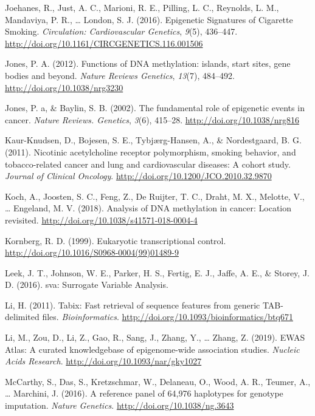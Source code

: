 \documentclass[11pt,twoside]{bristolthesis}
\newlength{\cslhangindent}
\newenvironment{cslreferences}%
  {\setlength{\parindent}{0pt}%
  \everypar{\setlength{\hangindent}{\cslhangindent}}\ignorespaces}%
  {\par}
\begin{document}
\begin{cslreferences}
\leavevmode\hypertarget{ref-Joehanes2016}{}%
Joehanes, R., Just, A. C., Marioni, R. E., Pilling, L. C., Reynolds, L. M., Mandaviya, P. R., \ldots{} London, S. J. (2016). Epigenetic Signatures of Cigarette Smoking. \emph{Circulation: Cardiovascular Genetics}, \emph{9}(5), 436--447. \url{http://doi.org/10.1161/CIRCGENETICS.116.001506}

\leavevmode\hypertarget{ref-Jones2012}{}%
Jones, P. A. (2012). Functions of DNA methylation: islands, start sites, gene bodies and beyond. \emph{Nature Reviews Genetics}, \emph{13}(7), 484--492. \url{http://doi.org/10.1038/nrg3230}

\leavevmode\hypertarget{ref-Jones2002}{}%
Jones, P. a, \& Baylin, S. B. (2002). The fundamental role of epigenetic events in cancer. \emph{Nature Reviews. Genetics}, \emph{3}(6), 415--28. \url{http://doi.org/10.1038/nrg816}

\leavevmode\hypertarget{ref-Kaur-Knudsen2011}{}%
Kaur-Knudsen, D., Bojesen, S. E., Tybjærg-Hansen, A., \& Nordestgaard, B. G. (2011). Nicotinic acetylcholine receptor polymorphism, smoking behavior, and tobacco-related cancer and lung and cardiovascular diseases: A cohort study. \emph{Journal of Clinical Oncology}. \url{http://doi.org/10.1200/JCO.2010.32.9870}

\leavevmode\hypertarget{ref-Koch2018}{}%
Koch, A., Joosten, S. C., Feng, Z., De Ruijter, T. C., Draht, M. X., Melotte, V., \ldots{} Engeland, M. V. (2018). Analysis of DNA methylation in cancer: Location revisited. \url{http://doi.org/10.1038/s41571-018-0004-4}

\leavevmode\hypertarget{ref-Kornberg1999}{}%
Kornberg, R. D. (1999). Eukaryotic transcriptional control. \url{http://doi.org/10.1016/S0968-0004(99)01489-9}

\leavevmode\hypertarget{ref-Leek2016}{}%
Leek, J. T., Johnson, W. E., Parker, H. S., Fertig, E. J., Jaffe, A. E., \& Storey, J. D. (2016). sva: Surrogate Variable Analysis.

\leavevmode\hypertarget{ref-Li2011}{}%
Li, H. (2011). Tabix: Fast retrieval of sequence features from generic TAB-delimited files. \emph{Bioinformatics}. \url{http://doi.org/10.1093/bioinformatics/btq671}

\leavevmode\hypertarget{ref-Li2019}{}%
Li, M., Zou, D., Li, Z., Gao, R., Sang, J., Zhang, Y., \ldots{} Zhang, Z. (2019). EWAS Atlas: A curated knowledgebase of epigenome-wide association studies. \emph{Nucleic Acids Research}. \url{http://doi.org/10.1093/nar/gky1027}

\leavevmode\hypertarget{ref-McCarthy2016}{}%
McCarthy, S., Das, S., Kretzschmar, W., Delaneau, O., Wood, A. R., Teumer, A., \ldots{} Marchini, J. (2016). A reference panel of 64,976 haplotypes for genotype imputation. \emph{Nature Genetics}. \url{http://doi.org/10.1038/ng.3643}


\end{cslreferences}
\end{document}
